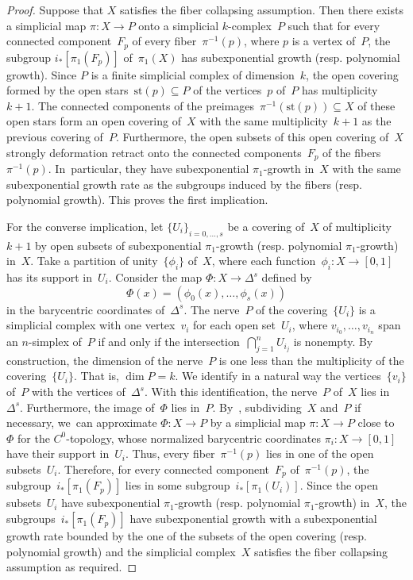 \documentclass[11pt]{article}
\newcommand{\resp}{resp.\xspace}
\theoremstyle{definition}
\numberwithin{equation}{section}
\begin{document}
\begin{proof}
Suppose that $X$ satisfies the fiber collapsing assumption.
Then there exists a simplicial map $\pi:X \to P$ onto a simplicial $k$-complex~$P$ such that for every connected component~$F_p$ of every fiber~$\pi^{-1}(p)$, where $p$ is a vertex of~$P$, the subgroup $i_*[\pi_1(F_p)]$ of~$\pi_1(X)$ has subexponential growth (\resp polynomial growth).
Since $P$ is a finite simplicial complex of dimension~$k$, the open covering formed by the open stars~$\textrm{st}(p) \subseteq P$ of the vertices~$p$ of~$P$ has multiplicity~$k+1$.
The connected components of the preimages~$\pi^{-1}(\textrm{st}(p)) \subseteq X$ of these open stars form an open covering of~$X$ with the same multiplicity~$k+1$ as the previous covering of~$P$.
Furthermore, the open subsets of this open covering of~$X$ strongly deformation retract onto the connected components~$F_p$ of the fibers~$\pi^{-1}(p)$. In~particular, they have subexponential $\pi_1$-growth in~$X$ with the same subexponential growth rate as the subgroups induced by the fibers (\resp polynomial growth).
This proves the first implication.

For the converse implication, let $\{U_i\}_{i=0,\dots,s}$ be a covering of~$X$ of multiplicity~$k+1$ by open subsets of subexponential $\pi_1$-growth (\resp polynomial $\pi_1$-growth) in~$X$.
Take a partition of unity~$\{\phi_i\}$ of~$X$, where each function~$\phi_i:X \to [0,1]$ has its support in~$U_i$.
Consider the map $\Phi:X \to \Delta^{s}$ defined by
\[
\Phi(x) = (\phi_0(x),\dots,\phi_s(x))
\]
in the barycentric coordinates of~$\Delta^{s}$.
The nerve~$P$ of the covering~$\{U_i\}$ is a simplicial complex with one vertex~$v_i$ for each open set~$U_i$, where $v_{i_0},\dots,v_{i_n}$ span an $n$-simplex of~$P$ if and only if the intersection~$\bigcap_{j=1}^n U_{i_j}$ is nonempty.
By construction, the dimension of the nerve~$P$ is one less than the multiplicity of the covering~$\{U_i\}$.
That is, $\dim P = k$.
We identify in a natural way the vertices~$\{v_i\}$ of~$P$ with the vertices of~$\Delta^{s}$.
With this identification, the nerve~$P$ of~$X$ lies in~$\Delta^{s}$.
Furthermore, the image of~$\Phi$ lies in~$P$.
By~\cite[\S2.C]{hatcher}, subdividing~$X$ and~$P$ if necessary, we~can approximate $\Phi:X \to P$ by a simplicial map $\pi:X \to P$ close to~$\Phi$ for the $C^0$-topology, whose normalized barycentric coordinates $\pi_i:X \to [0,1]$ have their support in~$U_i$.
Thus, every fiber~$\pi^{-1}(p)$ lies in one of the open subsets~$U_i$.
Therefore, for every connected component~$F_p$ of~$\pi^{-1}(p)$, the subgroup~$i_*[\pi_1(F_p)]$ lies in some subgroup~$i_*[\pi_1(U_i)]$.
Since the open subsets~$U_i$ have subexponential $\pi_1$-growth (\resp polynomial $\pi_1$-growth) in~$X$, the subgroups~$i_*[\pi_1(F_p)]$ have subexponential growth with a subexponential growth rate bounded by the one of the subsets of the open covering (\resp polynomial growth) and the simplicial complex~$X$ satisfies the fiber collapsing assumption as required.
\end{proof}
\end{document}
